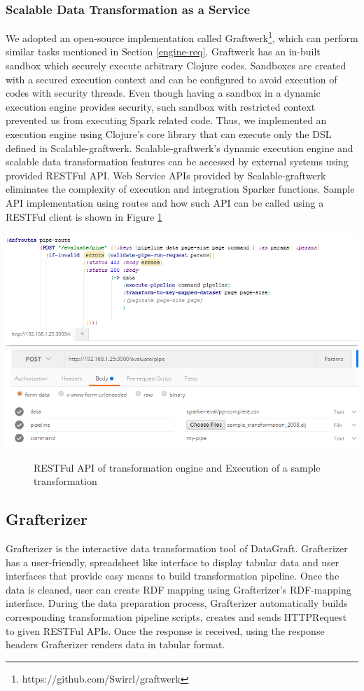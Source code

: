 \subsubsection{Scalable Data Transformation as a Service}
We adopted an open-source implementation called Graftwerk\footnote{https://github.com/Swirrl/graftwerk}, which can perform similar tasks mentioned in Section \ref{engine-req}. Graftwerk has an in-built sandbox which securely execute arbitrary Clojure codes. Sandboxes are created with a secured execution context and can be configured to avoid execution of codes with security threads. Even though having a sandbox in a dynamic execution engine provides security, such sandbox with restricted context prevented us from executing Spark related code. Thus, we implemented an execution engine using Clojure's core library that can execute only the DSL defined in Scalable-graftwerk. Scalable-graftwerk's dynamic execution engine and scalable data transformation features can be accessed by external systems using provided RESTFul API. Web Service APIs provided by Scalable-graftwerk eliminates the complexity of execution and integration Sparker functions. 
Sample API implementation using routes and how such API can be called using a RESTFul client is shown in Figure \ref{fig:sample-route} 
\begin{center}
\includegraphics[width=36em]{./Figures/sample-route}
\begin{figure}[htbp]
\caption{RESTFul API of transformation engine and Execution of a sample transformation}
\label{fig:sample-route}
\end{figure}
\end{center}
\subsection{Grafterizer}
Grafterizer is the interactive data transformation tool of DataGraft. Grafterizer has a user-friendly, spreadsheet like interface to display tabular data and user interfaces that provide easy means to build transformation pipeline. Once the data is cleaned, user can create RDF mapping using Grafterizer's RDF-mapping interface. During the data preparation process, Grafterizer automatically builds corresponding transformation pipeline scripts, creates and sends HTTPRequest to given RESTFul APIs. Once the response is received, using the response headers Grafterizer renders data in tabular format. 

